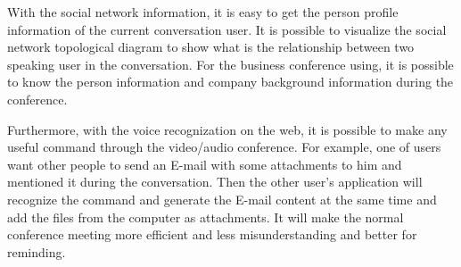 \par With the social network information, it is easy to get the person profile information of the current conversation user. It is possible to visualize the social network topological diagram to show what is the relationship between two speaking user in the conversation. For the business conference using, it is possible to know the person information and company background information during the conference.

\par Furthermore, with the voice recognization on the web, it is possible to make any useful command through the video/audio conference. For example, one of users want other people to send an E-mail with some attachments to him and mentioned it during the conversation. Then the other user's application will recognize the command and generate the E-mail content at the same time and add the files from the computer as attachments. It will make the normal conference meeting more efficient and less misunderstanding and better for reminding.

